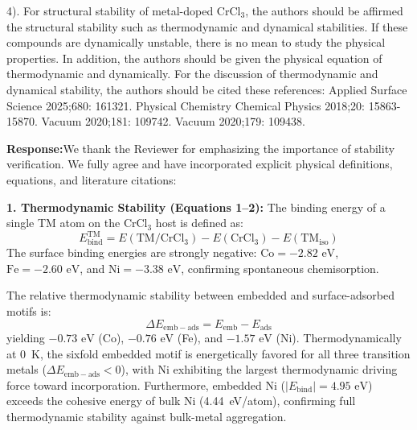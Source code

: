 \documentclass[11pt, sans, a4paper]{moderncv}
\newcommand{\response}{\vspace{0.4em}\noindent\textbf{\color{actionblue}Response:}\hspace{0.5em}}
\begin{document}
\vspace{0.8em}

\begin{reviewercomment}
4). For structural stability of metal-doped $\text{CrCl}_3$, the authors should be affirmed the structural stability such as thermodynamic and dynamical stabilities. If these compounds are dynamically unstable, there is no mean to study the physical properties. In addition, the authors should be given the physical equation of thermodynamic and dynamically. For the discussion of thermodynamic and dynamical stability, the authors should be cited these references: Applied Surface Science 2025;680: 161321. Physical Chemistry Chemical Physics 2018;20: 15863-15870. Vacuum 2020;181: 109742. Vacuum 2020;179: 109438.
\end{reviewercomment}

\response We thank the Reviewer for emphasizing the importance of stability verification. We fully agree and have incorporated explicit physical definitions, equations, and literature citations:

\noindent\textbf{1. Thermodynamic Stability (Equations 1--2):}
The binding energy of a single TM atom on the $\text{CrCl}_3$ host is defined as:
\begin{equation}
E_{\mathrm{bind}}^{\mathrm{TM}} = E(\mathrm{TM}/\mathrm{CrCl}_3) - E(\mathrm{CrCl}_3) - E(\mathrm{TM}_{\mathrm{iso}})
\end{equation}
The surface binding energies are strongly negative: $\text{Co} = -2.82\text{ eV}$, $\text{Fe} = -2.60\text{ eV}$, and $\text{Ni} = -3.38\text{ eV}$, confirming spontaneous chemisorption.

The relative thermodynamic stability between embedded and surface-adsorbed motifs is:
\begin{equation}
\Delta E_{\mathrm{emb-ads}} = E_{\mathrm{emb}} - E_{\mathrm{ads}}
\end{equation}
yielding $-0.73\text{ eV}$ (Co), $-0.76\text{ eV}$ (Fe), and $-1.57\text{ eV}$ (Ni). Thermodynamically at 0~K, the sixfold embedded motif is energetically favored for all three transition metals ($\Delta E_{\mathrm{emb-ads}} < 0$), with Ni exhibiting the largest thermodynamic driving force toward incorporation. Furthermore, embedded Ni ($|E_{\mathrm{bind}}| = 4.95\text{ eV}$) exceeds the cohesive energy of bulk Ni (4.44~eV/atom), confirming full thermodynamic stability against bulk-metal aggregation.
\end{document}

